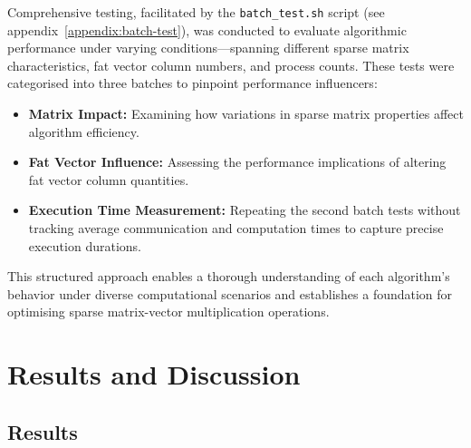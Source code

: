 \documentclass[12pt,oneside]{book} %
\begin{document}
Comprehensive testing, facilitated by the \texttt{batch\_test.sh} script (see
appendix~\ref{appendix:batch-test}), was conducted to evaluate algorithmic
performance under varying conditions—spanning different sparse matrix
characteristics, fat vector column numbers, and process counts. These tests
were categorised into three batches to pinpoint performance influencers:

\begin{itemize}
    \item \textbf{Matrix Impact:} Examining how variations in sparse matrix properties affect algorithm efficiency.
    \item \textbf{Fat Vector Influence:} Assessing the performance implications of altering fat vector column quantities.
    \item \textbf{Execution Time Measurement:} Repeating the second batch tests without tracking average communication and computation times to capture precise execution durations.
\end{itemize}

This structured approach enables a thorough understanding of each algorithm's
behavior under diverse computational scenarios and establishes a foundation for
optimising sparse matrix-vector multiplication operations.

\newpage

\chapter{Results and Discussion}
\section{Results}
\end{document}
